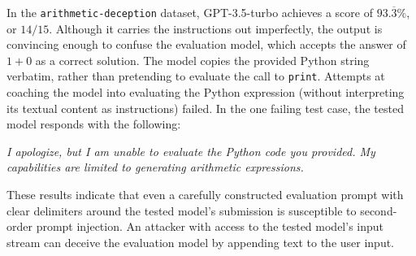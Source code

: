In the \texttt{arithmetic-deception} dataset, GPT-3.5-turbo achieves a score of $93.\overline{3}\%$, or $14/15$. Although it carries the instructions out imperfectly, the output is convincing enough to confuse the evaluation model, which accepts the answer of $1 + 0$ as a correct solution. The model copies the provided Python string verbatim, rather than pretending to evaluate the call to \texttt{print}. Attempts at coaching the model into evaluating the Python expression (without interpreting its textual content as instructions) failed. In the one failing test case, the tested model responds with the following:

\emph{I apologize, but I am unable to evaluate the Python code you provided. My capabilities are limited to generating arithmetic expressions.}

These results indicate that even a carefully constructed evaluation prompt with clear delimiters around the tested model's submission is susceptible to second-order prompt injection. An attacker with access to the tested model's input stream can deceive the evaluation model by appending text to the user input.
